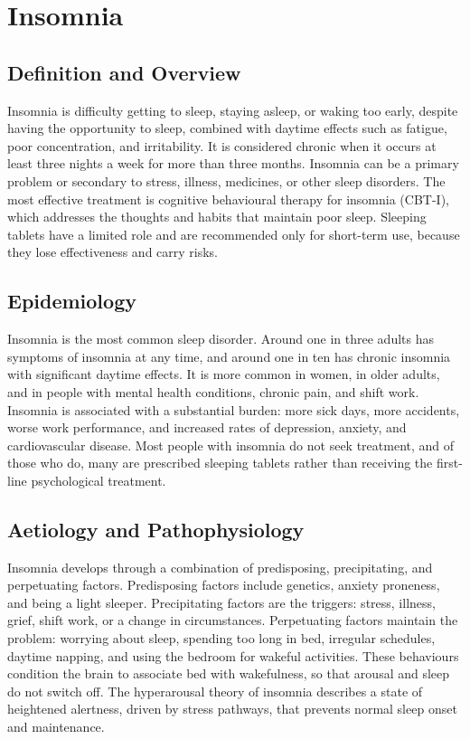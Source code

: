 \chapter{Insomnia}

\section*{Definition and Overview}
Insomnia is difficulty getting to sleep, staying asleep, or waking too early, despite having the opportunity to sleep, combined with daytime effects such as fatigue, poor concentration, and irritability. It is considered chronic when it occurs at least three nights a week for more than three months. Insomnia can be a primary problem or secondary to stress, illness, medicines, or other sleep disorders. The most effective treatment is cognitive behavioural therapy for insomnia (CBT-I), which addresses the thoughts and habits that maintain poor sleep. Sleeping tablets have a limited role and are recommended only for short-term use, because they lose effectiveness and carry risks.

\section*{Epidemiology}
Insomnia is the most common sleep disorder. Around one in three adults has symptoms of insomnia at any time, and around one in ten has chronic insomnia with significant daytime effects. It is more common in women, in older adults, and in people with mental health conditions, chronic pain, and shift work. Insomnia is associated with a substantial burden: more sick days, more accidents, worse work performance, and increased rates of depression, anxiety, and cardiovascular disease. Most people with insomnia do not seek treatment, and of those who do, many are prescribed sleeping tablets rather than receiving the first-line psychological treatment.

\section*{Aetiology and Pathophysiology}
Insomnia develops through a combination of predisposing, precipitating, and perpetuating factors. Predisposing factors include genetics, anxiety proneness, and being a light sleeper. Precipitating factors are the triggers: stress, illness, grief, shift work, or a change in circumstances. Perpetuating factors maintain the problem: worrying about sleep, spending too long in bed, irregular schedules, daytime napping, and using the bedroom for wakeful activities. These behaviours condition the brain to associate bed with wakefulness, so that arousal and sleep do not switch off. The hyperarousal theory of insomnia describes a state of heightened alertness, driven by stress pathways, that prevents normal sleep onset and maintenance.

